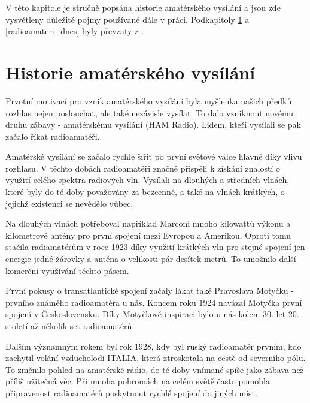 V této kapitole je stručně popsána historie amatérského vysílání a jsou zde vysvětleny důležité pojmy používané dále v práci.
Podkapitoly \ref{radioamateri_hist} a \ref{radioamateri_dnes} byly převzaty z \cite{crk_hist}.

\section{Historie amatérského vysílání}
\label{radioamateri_hist}
Prvotní motivací pro vznik amatérského vysílání %
byla myšlenka našich předků rozhlas %
nejen poslouchat, ale také nezávisle vysílat.
To dalo vzniknout novému druhu zábavy - amatérskému vysílání (HAM Radio). Lidem, kteří vysílali se pak začalo říkat 
radioamatéři.

Amatérské vysílání se začalo rychle šířit po první světové válce hlavně díky vlivu
rozhlasu. %
V těchto dobách radioamatéři značně
přispěli k získání znalostí o využití celého spektra radiových vln. Vysílali na dlouhých a středních vlnách, které byly do té doby
považovány za bezcenné, a také na vlnách krátkých, o jejichž existenci se nevědělo vůbec.

Na dlouhých vlnách potřeboval například Marconi mnoho kilowattů výkonu a kilometrové antény pro první spojení
mezi Evropou a Amerikou. Oproti tomu stačila radiamatérům v roce 1923 díky využití krátkých vln
pro stejné spojení jen energie jedné žárovky a anténa o velikosti pár desítek metrů. To umožnilo další komerční
využívání těchto pásem.

První pokusy o transatlantické spojení začaly lákat také Pravoslava Motyčku - prvního známého radioamatéra u nás.
Koncem roku 1924 navázal Motyčka první spojení v Československu. 
Díky Motyčkově inspiraci bylo u nás kolem 30. let 20. století až několik set radioamatérů.

Dalším významným rokem byl rok 1928, kdy byl ruský radioamatér prvním, kdo zachytil volání vzducholodi ITALIA,
která ztroskotala na cestě od severního pólu. To změnilo pohled na amatérské rádio, do té doby vnímané spíše jako zábava než
příliš užitečná věc. Při mnoha pohromách na celém světě často pomohla připravenost radioamatérů poskytnout rychlé spojení do
jiných míst.


